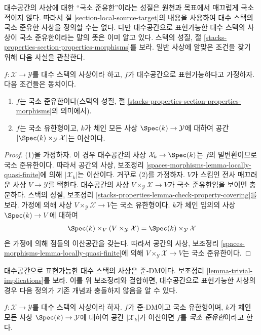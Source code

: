 \noindent
대수공간의 사상에 대한 ``국소 준유한''이라는 성질은 원천과 목표에서
매끄럽게 국소적이지 않다. 따라서 절 \ref{section-local-source-target}의
내용을 사용하여 대수 스택의 국소 준유한 사상을 정의할 수는 없다.
다만 대수공간으로 표현가능한 대수 스택의 사상이 국소 준유한이라는
말의 뜻은 이미 알고 있다. 스택의 성질, 절
\ref{stacks-properties-section-properties-morphisms}를 보라.
일반 사상에 알맞은 조건을 찾기 위해 다음 사실을 관찰한다.

\begin{lemma}
\label{lemma-representable-by-spaces-quasi-finite}
$f : \mathcal{X} \to \mathcal{Y}$를 대수 스택의 사상이라 하고, $f$가
대수공간으로 표현가능하다고 가정하자. 다음 조건들은 동치이다.
\begin{enumerate}
\item $f$는 국소 준유한이다(스택의 성질, 절
\ref{stacks-properties-section-properties-morphisms}의 의미에서).
\item $f$는 국소 유한형이고, $k$가 체인 모든 사상
$\Spec(k) \to \mathcal{Y}$에 대하여 공간
$|\Spec(k) \times_\mathcal{Y} \mathcal{X}|$는 이산이다.
\end{enumerate}
\end{lemma}

\begin{proof}
(1)을 가정하자. 이 경우 대수공간의 사상
$\mathcal{X}_k \to \Spec(k)$는 $f$의 밑변환이므로 국소 준유한이다.
따라서 공간의 사상, 보조정리
\ref{spaces-morphisms-lemma-locally-quasi-finite}에 의해
$|\mathcal{X}_k|$는 이산이다. 거꾸로 (2)를 가정하자. $V$가 스킴인
전사 매끄러운 사상 $V \to \mathcal{Y}$를 택한다. 대수공간의 사상
$V \times_\mathcal{Y} \mathcal{X} \to V$가 국소 준유한임을 보이면
충분하다. 스택의 성질, 보조정리
\ref{stacks-properties-lemma-check-property-covering}를 보라.
가정에 의해 사상 $V \times_\mathcal{Y} \mathcal{X} \to V$는 국소
유한형이다. $k$가 체인 임의의 사상 $\Spec(k) \to V$에 대하여
$$
\Spec(k) \times_V (V \times_\mathcal{Y} \mathcal{X}) =
\Spec(k) \times_\mathcal{Y} \mathcal{X}
$$
은 가정에 의해 점들의 이산공간을 갖는다. 따라서 공간의 사상,
보조정리 \ref{spaces-morphisms-lemma-locally-quasi-finite}에 의해
$V \times_\mathcal{Y} \mathcal{X} \to V$는 국소 준유한이다.
\end{proof}

\noindent
대수공간으로 표현가능한 대수 스택의 사상은 준-DM이다. 보조정리
\ref{lemma-trivial-implications}를 보라. 이를 위 보조정리와 결합하면,
대수공간으로 표현가능한 사상의 경우 다음 정의가 기존 개념과 충돌하지
않음을 알 수 있다.

\begin{definition}
\label{definition-locally-quasi-finite}
$f : \mathcal{X} \to \mathcal{Y}$를 대수 스택의 사상이라 하자.
$f$가 준-DM이고 국소 유한형이며, $k$가 체인 모든 사상
$\Spec(k) \to \mathcal{Y}$에 대하여 공간 $|\mathcal{X}_k|$가
이산이면 $f$를 {\it 국소 준유한}이라고 한다.
\end{definition}

